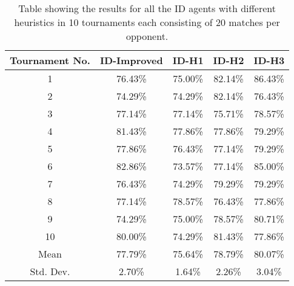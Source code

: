 \documentclass{article} %
\begin{document}
\begin{table}[!ht]
    \caption{Table showing the results for all the ID agents with different
           heuristics in 10 tournaments each consisting of 20 matches per opponent.}
    \label{table_1}
    \centering
    \bgroup
	\def\arraystretch{1.5}%
    \tabcolsep=0.11cm
    \begin{tabular}{|c|c|c|c|c|}
        \hline
        Tournament No. & ID-Improved & ID-H1 & ID-H2 & ID-H3 \\
        \hline
        1 & 76.43\% & 75.00\% & 82.14\% & 86.43\% \\
        \hline
        2 & 74.29\% & 74.29\% & 82.14\% & 76.43\% \\
        \hline
        3 & 77.14\% & 77.14\% & 75.71\% & 78.57\% \\
        \hline
        4 & 81.43\% & 77.86\% & 77.86\% & 79.29\%\\
        \hline
        5 & 77.86\% & 76.43\% & 77.14\% & 79.29\% \\
        \hline
        6 & 82.86\% & 73.57\% & 77.14\% & 85.00\% \\
        \hline
        7 & 76.43\% & 74.29\% & 79.29\% & 79.29\%\\
        \hline
        8 & 77.14\% & 78.57\% & 76.43\% & 77.86\% \\
        \hline
        9 & 74.29\% & 75.00\% & 78.57\% & 80.71\%\\
        \hline
        10 & 80.00\% & 74.29\% & 81.43\% & 77.86\% \\
        \hline
        Mean & 77.79\% & 75.64\% & 78.79\% & 80.07\% \\
        \hline
        Std. Dev. & 2.70\% & 1.64\% & 2.26\% & 3.04\% \\
        \hline
    \end{tabular}
    \egroup
\end{table}
\end{document}
